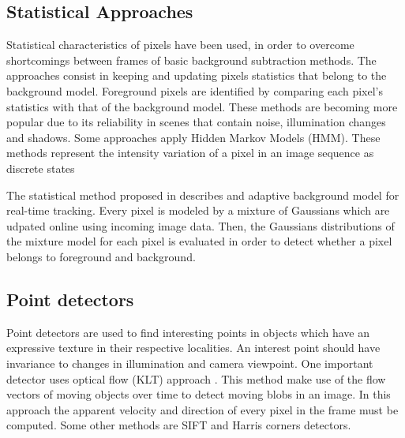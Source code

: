 \subsection{Statistical Approaches}

Statistical characteristics of pixels have been used, in order to overcome
shortcomings between frames of basic background subtraction methods. The
approaches consist in keeping and updating pixels statistics that belong to the background model. Foreground pixels are identified by comparing each pixel's
statistics with that of the background model. These methods are becoming more
popular due to its reliability in scenes that contain noise, illumination
changes and shadows. Some approaches apply Hidden Markov Models (HMM). These
methods \cite{Stenger2001,Rittscher2000} represent the intensity variation of a
pixel in an image sequence as discrete states

The statistical method proposed in \cite{Pham2010} describes and adaptive
background model for real-time tracking. Every pixel is modeled by a mixture of
Gaussians which are udpated online using incoming image data. Then, the
Gaussians distributions of the mixture model for each pixel is evaluated
in order to detect whether a pixel belongs to foreground and background.

\subsection{Point detectors}

Point detectors are used to find interesting points in objects which have an
expressive texture in their respective localities. An interest point should
have invariance to changes in illumination and camera viewpoint. One important
detector uses optical flow (KLT) approach \cite{Shi1994}. This method make use
of the flow vectors of moving objects over time to detect moving blobs in an
image. In this approach the apparent velocity and direction of every pixel in
the frame must be computed. Some other methods are SIFT \cite{Lowe2004b} and
Harris \cite{Harris1988} corners detectors.

